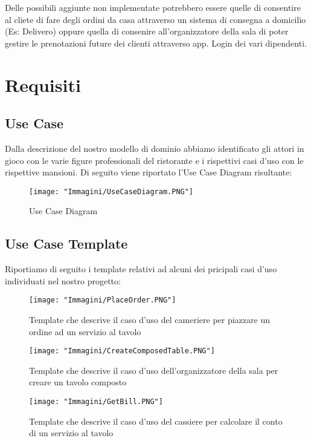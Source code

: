 \documentclass{article}
\begin{document}
Delle possibili aggiunte non implementate potrebbero essere quelle di consentire al cliete di fare degli ordini da casa attraverso un sistema di consegna a domicilio (Es: Delivero) oppure quella di consenire all'organizzatore della sala di poter gestire le prenotazioni future dei clienti attraverso app. Login dei vari dipendenti. 


\newpage

\section{Requisiti}
\subsection{Use Case}

Dalla descrizione del nostro modello di dominio abbiamo identificato gli attori in gioco con le varie figure professionali del ristorante e i rispettivi casi d'uso con le rispettive mansioni. Di seguito viene riportato l'Use Case Diagram risultante:

\begin{figure}[!h]
\centering
\texttt{[image: "Immagini/UseCaseDiagram.PNG"]}
\caption{Use Case Diagram}
\end{figure}

\newpage

\subsection{Use Case Template}
Riportiamo di seguito i template relativi ad alcuni dei pricipali casi d'uso individuati nel nostro progetto:

\begin{figure}[!h]
\centering
\texttt{[image: "Immagini/PlaceOrder.PNG"]}
\caption{Template che descrive il caso d'uso del cameriere per piazzare un ordine ad un servizio al tavolo}
\end{figure}

\begin{figure}[!h]
\centering
\texttt{[image: "Immagini/CreateComposedTable.PNG"]}
\caption{Template che descrive il caso d'uso dell'organizzatore della sala per creare un tavolo composto}
\end{figure}

\newpage

\begin{figure}[!h]
\centering
\texttt{[image: "Immagini/GetBill.PNG"]}
\caption{Template che descrive il caso d'uso del cassiere per calcolare il conto di un servizio al tavolo}
\end{figure}
\end{document}
